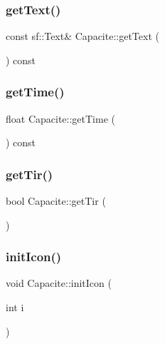 \subsubsection{\texorpdfstring{get\+Text()}{getText()}}
{\footnotesize\ttfamily const sf\+::\+Text\& Capacite\+::get\+Text (\begin{DoxyParamCaption}{ }\end{DoxyParamCaption}) const\hspace{0.3cm}{\ttfamily [inline]}}

\mbox{\label{class_capacite_abb50c03553bc0b08585c3886c0a22656}} 
\subsubsection{\texorpdfstring{get\+Time()}{getTime()}}
{\footnotesize\ttfamily float Capacite\+::get\+Time (\begin{DoxyParamCaption}{ }\end{DoxyParamCaption}) const\hspace{0.3cm}{\ttfamily [inline]}}

\mbox{\label{class_capacite_a40152147df357f3c0d9ea1116b0f7241}} 
\subsubsection{\texorpdfstring{get\+Tir()}{getTir()}}
{\footnotesize\ttfamily bool Capacite\+::get\+Tir (\begin{DoxyParamCaption}{ }\end{DoxyParamCaption})\hspace{0.3cm}{\ttfamily [inline]}}

\mbox{\label{class_capacite_aba7e297324570300fe7786dddb8c05ef}} 
\subsubsection{\texorpdfstring{init\+Icon()}{initIcon()}}
{\footnotesize\ttfamily void Capacite\+::init\+Icon (\begin{DoxyParamCaption}\item[{int}]{i }\end{DoxyParamCaption})}

